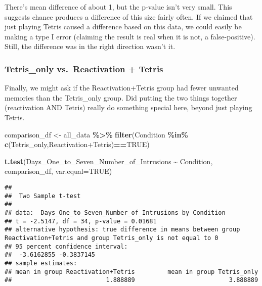 \documentclass[
]{book}
\newenvironment{Shaded}{\begin{snugshade}}{\end{snugshade}}
\newcommand{\AttributeTok}[1]{\textcolor[rgb]{0.13,0.29,0.53}{#1}}
\newcommand{\ConstantTok}[1]{\textcolor[rgb]{0.56,0.35,0.01}{#1}}
\newcommand{\FunctionTok}[1]{\textcolor[rgb]{0.13,0.29,0.53}{\textbf{#1}}}
\newcommand{\NormalTok}[1]{#1}
\newcommand{\OtherTok}[1]{\textcolor[rgb]{0.56,0.35,0.01}{#1}}
\newcommand{\SpecialCharTok}[1]{\textcolor[rgb]{0.81,0.36,0.00}{\textbf{#1}}}
\newcommand{\StringTok}[1]{\textcolor[rgb]{0.31,0.60,0.02}{#1}}
\begin{document}
There's mean difference of about 1, but the p-value isn't very small. This suggests chance produces a difference of this size fairly often. If we claimed that just playing Tetris caused a difference based on this data, we could easily be making a type I error (claiming the result is real when it is not, a false-positive). Still, the difference was in the right direction wasn't it.

\hypertarget{tetris_only-vs.-reactivation-tetris}{%
\subsubsection{Tetris\_only vs.~Reactivation + Tetris}\label{tetris_only-vs.-reactivation-tetris}}

Finally, we might ask if the Reactivation+Tetris group had fewer unwanted memories than the Tetris\_only group. Did putting the two things together (reactivation AND Tetris) really do something special here, beyond just playing Tetris.

\begin{Shaded}
\begin{Highlighting}[]
\NormalTok{comparison\_df }\OtherTok{\textless{}{-}}\NormalTok{ all\_data }\SpecialCharTok{\%\textgreater{}\%} 
                  \FunctionTok{filter}\NormalTok{(Condition }\SpecialCharTok{\%in\%} \FunctionTok{c}\NormalTok{(}\StringTok{\textquotesingle{}Tetris\_only\textquotesingle{}}\NormalTok{,}\StringTok{\textquotesingle{}Reactivation+Tetris\textquotesingle{}}\NormalTok{)}\SpecialCharTok{==}\ConstantTok{TRUE}\NormalTok{)}
                        
\FunctionTok{t.test}\NormalTok{(Days\_One\_to\_Seven\_Number\_of\_Intrusions }\SpecialCharTok{\textasciitilde{}}\NormalTok{ Condition, }
\NormalTok{       comparison\_df,}
       \AttributeTok{var.equal=}\ConstantTok{TRUE}\NormalTok{)}
\end{Highlighting}
\end{Shaded}

\begin{verbatim}
## 
##  Two Sample t-test
## 
## data:  Days_One_to_Seven_Number_of_Intrusions by Condition
## t = -2.5147, df = 34, p-value = 0.01681
## alternative hypothesis: true difference in means between group Reactivation+Tetris and group Tetris_only is not equal to 0
## 95 percent confidence interval:
##  -3.6162855 -0.3837145
## sample estimates:
## mean in group Reactivation+Tetris         mean in group Tetris_only 
##                          1.888889                          3.888889
\end{verbatim}
\end{document}
